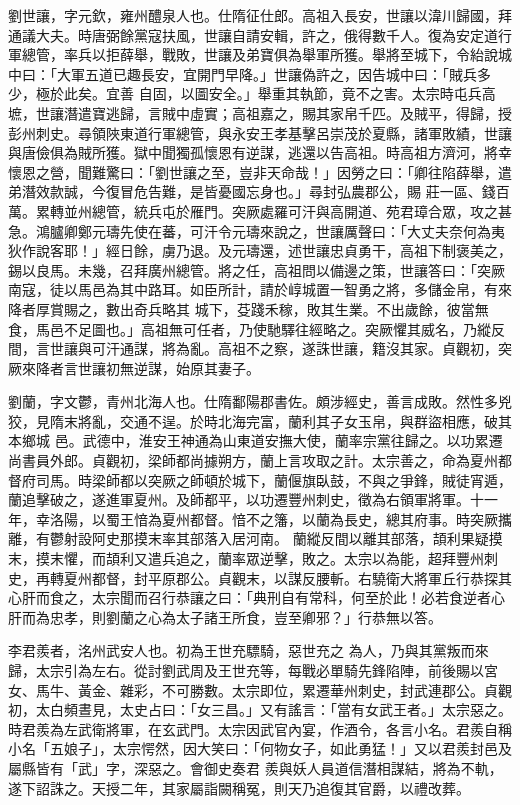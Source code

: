 \begin{pinyinscope}
 劉世讓，字元欽，雍州醴泉人也。仕隋征仕郎。高祖入長安，世讓以湋川歸國，拜通議大夫。時唐弼餘黨寇扶風，世讓自請安輯，許之，俄得數千人。復為安定道行軍總管，率兵以拒薛舉，戰敗，世讓及弟寶俱為舉軍所獲。舉將至城下，令紿說城中曰：「大軍五道已趣長安，宜開門早降。」世讓偽許之，因告城中曰：「賊兵多少，極於此矣。宜善
 自固，以圖安全。」舉重其執節，竟不之害。太宗時屯兵高墌，世讓潛遣寶逃歸，言賊中虛實；高祖嘉之，賜其家帛千匹。及賊平，得歸，授彭州刺史。尋領陜東道行軍總管，與永安王孝基擊呂崇茂於夏縣，諸軍敗績，世讓與唐儉俱為賊所獲。獄中聞獨孤懷恩有逆謀，逃還以告高祖。時高祖方濟河，將幸懷恩之營，聞難驚曰：「劉世讓之至，豈非天命哉！」因勞之曰：「卿往陷薛舉，遣弟潛效款誠，今復冒危告難，是皆憂國忘身也。」尋封弘農郡公，賜
 莊一區、錢百萬。累轉並州總管，統兵屯於雁門。突厥處羅可汗與高開道、苑君璋合眾，攻之甚急。鴻臚卿鄭元璹先使在蕃，可汗令元璹來說之，世讓厲聲曰：「大丈夫奈何為夷狄作說客耶！」經日餘，虜乃退。及元璹還，述世讓忠貞勇干，高祖下制褒美之，錫以良馬。未幾，召拜廣州總管。將之任，高祖問以備邊之策，世讓答曰：「突厥南寇，徒以馬邑為其中路耳。如臣所計，請於崞城置一智勇之將，多儲金帛，有來降者厚賞賜之，數出奇兵略其
 城下，芟踐禾稼，敗其生業。不出歲餘，彼當無食，馬邑不足圖也。」高祖無可任者，乃使馳驛往經略之。突厥懼其威名，乃縱反間，言世讓與可汗通謀，將為亂。高祖不之察，遂誅世讓，籍沒其家。貞觀初，突厥來降者言世讓初無逆謀，始原其妻子。



 劉蘭，字文鬱，青州北海人也。仕隋鄱陽郡書佐。頗涉經史，善言成敗。然性多兇狡，見隋末將亂，交通不逞。於時北海完富，蘭利其子女玉帛，與群盜相應，破其本鄉城
 邑。武德中，淮安王神通為山東道安撫大使，蘭率宗黨往歸之。以功累遷尚書員外郎。貞觀初，梁師都尚據朔方，蘭上言攻取之計。太宗善之，命為夏州都督府司馬。時梁師都以突厥之師頓於城下，蘭偃旗臥鼓，不與之爭鋒，賊徒宵遁，蘭追擊破之，遂進軍夏州。及師都平，以功遷豐州刺史，徵為右領軍將軍。十一年，幸洛陽，以蜀王愔為夏州都督。愔不之籓，以蘭為長史，總其府事。時突厥攜離，有鬱射設阿史那摸末率其部落入居河南。
 蘭縱反間以離其部落，頡利果疑摸末，摸末懼，而頡利又遣兵追之，蘭率眾逆擊，敗之。太宗以為能，超拜豐州刺史，再轉夏州都督，封平原郡公。貞觀末，以謀反腰斬。右驍衛大將軍丘行恭探其心肝而食之，太宗聞而召行恭讓之曰：「典刑自有常科，何至於此！必若食逆者心肝而為忠孝，則劉蘭之心為太子諸王所食，豈至卿邪？」行恭無以答。



 李君羨者，洺州武安人也。初為王世充驃騎，惡世充之
 為人，乃與其黨叛而來歸，太宗引為左右。從討劉武周及王世充等，每戰必單騎先鋒陷陣，前後賜以宮女、馬牛、黃金、雜彩，不可勝數。太宗即位，累遷華州刺史，封武連郡公。貞觀初，太白頻晝見，太史占曰：「女三昌。」又有謠言：「當有女武王者。」太宗惡之。時君羨為左武衛將軍，在玄武門。太宗因武官內宴，作酒令，各言小名。君羨自稱小名「五娘子」，太宗愕然，因大笑曰：「何物女子，如此勇猛！」又以君羨封邑及屬縣皆有「武」字，深惡之。會御史奏君
 羨與妖人員道信潛相謀結，將為不軌，遂下詔誅之。天授二年，其家屬詣闕稱冤，則天乃追復其官爵，以禮改葬。




\end{pinyinscope}
